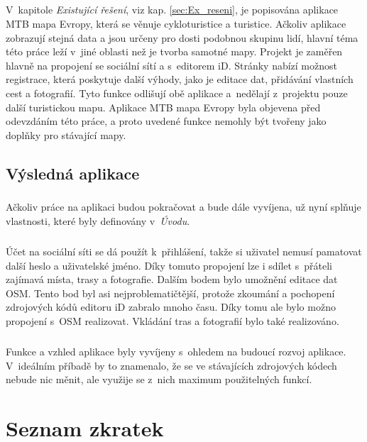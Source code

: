 \documentclass[11pt,a4paper,titlepage,oneside]{book}
\begin{document}
			\paragraph{} V~kapitole \textit{Existující řešení}, viz kap. \ref{sec:Ex_reseni}, je popisována aplikace MTB mapa Evropy, která se věnuje cykloturistice a turistice. Ačkoliv aplikace zobrazují stejná data a jsou určeny pro dosti podobnou skupinu lidí, hlavní téma této práce leží v~jiné oblasti než je tvorba samotné mapy. Projekt  je zaměřen hlavně na propojení se sociální sítí a s~editorem iD. Stránky  nabízí možnost registrace, která poskytuje další výhody, jako je editace dat, přidávání vlastních cest a fotografií. Tyto funkce odlišují obě aplikace a~nedělají z~projektu  pouze další turistickou mapu. Aplikace MTB mapa Evropy byla objevena před odevzdáním této práce, a proto uvedené funkce nemohly být tvořeny jako doplňky pro stávající mapy.

		\section{Výsledná aplikace}
			\paragraph{} Ačkoliv práce na aplikaci budou pokračovat a bude dále vyvíjena, už nyní splňuje vlastnosti, které byly definovány v~\textit{Úvodu}. 
			\paragraph {}Účet na sociální síti se dá použít k~přihlášení, takže si uživatel nemusí pamatovat další heslo a uživatelské jméno. Díky tomuto propojení lze i sdílet s~přáteli zajímavá místa, trasy a fotografie. Dalším bodem bylo umožnění editace dat \ac{OSM}. Tento bod byl asi nejproblematičtější, protože zkoumání a pochopení zdrojových kódů editoru iD zabralo mnoho času. Díky tomu ale bylo možno propojení s~\acl{OSM} realizovat. Vkládání tras a fotografií bylo také realizováno.
			\paragraph{} Funkce a vzhled aplikace byly vyvíjeny s~ohledem na budoucí rozvoj aplikace. V~ideálním příbadě by to znamenalo, že se ve stávajících zdrojových kódech nebude nic měnit, ale využije se z~nich maximum použitelných funkcí.


\newpage 
\chapter*{Seznam zkratek}
\end{document}
